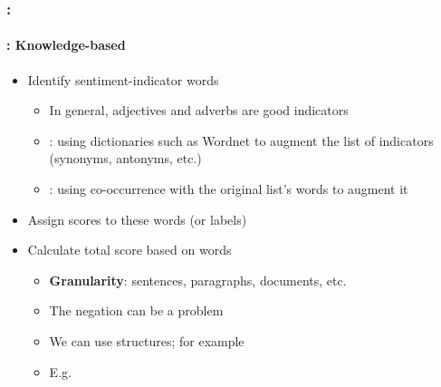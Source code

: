 \documentclass[xcolor=table]{beamer}
\begin{document}
\begin{frame}
	\frametitle{\insertshortsubtitle: \insertsection}
	\framesubtitle{\insertsubsection: Knowledge-based}
	
	\begin{itemize}
		\item Identify sentiment-indicator words
		\begin{itemize}
			\item In general, adjectives and adverbs are good indicators
			\item {}: using dictionaries such as Wordnet to augment the list of indicators (synonyms, antonyms, etc.) 
			\item {}: using co-occurrence with the original list's words to augment it 
		\end{itemize}
		\item Assign scores to these words (or labels)
		\item Calculate total score based on words
		\begin{itemize}
			\item \textbf{Granularity}: sentences, paragraphs, documents, etc. 
			\item The negation can be a problem
			\item We can use structures; for example 
			\item E.g. 
		\end{itemize}
	\end{itemize}
	
\end{frame}
\end{document}
